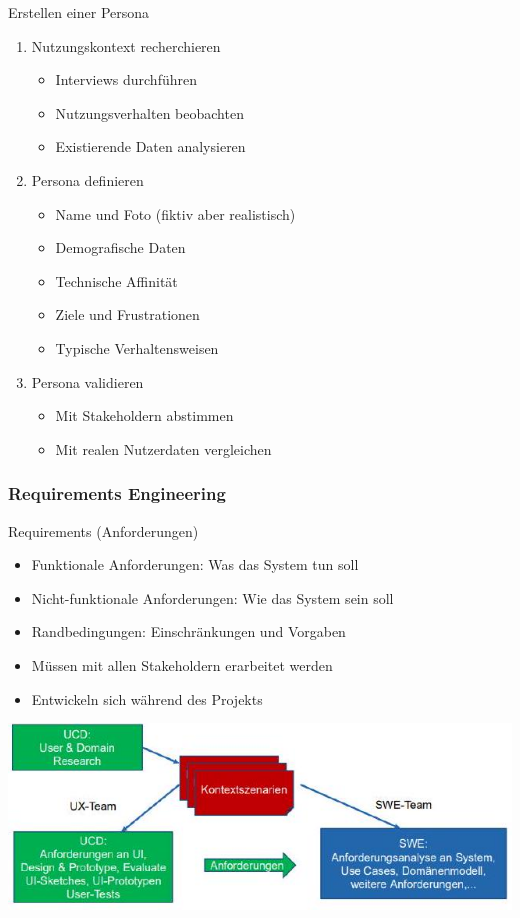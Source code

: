 \begin{KR}{Erstellen einer Persona}
\begin{enumerate}
    \item Nutzungskontext recherchieren
    \begin{itemize}
        \item Interviews durchführen
        \item Nutzungsverhalten beobachten
        \item Existierende Daten analysieren
    \end{itemize}
    \item Persona definieren
    \begin{itemize}
        \item Name und Foto (fiktiv aber realistisch)
        \item Demografische Daten
        \item Technische Affinität
        \item Ziele und Frustrationen
        \item Typische Verhaltensweisen
    \end{itemize}
    \item Persona validieren
    \begin{itemize}
        \item Mit Stakeholdern abstimmen
        \item Mit realen Nutzerdaten vergleichen
    \end{itemize}
\end{enumerate}
\end{KR}

\subsubsection{Requirements Engineering}

\begin{definition}{Requirements (Anforderungen)}
\begin{itemize}
    \item Funktionale Anforderungen: Was das System tun soll
    \item Nicht-funktionale Anforderungen: Wie das System sein soll
    \item Randbedingungen: Einschränkungen und Vorgaben
    \item Müssen mit allen Stakeholdern erarbeitet werden
    \item Entwickeln sich während des Projekts
\end{itemize}
\includegraphics[width=\linewidth]{images/2024_12_29_0d1d7b5551ea1b4b41bdg-04(1)}
\end{definition}

